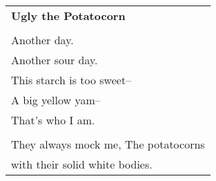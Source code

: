 \documentclass{article}
\begin{document}
\newcommand{\h}{\hspace{3ex}}
\newcommand{\hoar}{%
\begin{center}
\line(1,0){350}
\end{center}
}

\begin{center}
\begin{tabular}{l}
\textbf{Ugly the Potatocorn} \\
\\
Another day. \\
Another sour day. \\
This starch is too sweet--\\
A big yellow yam-- \\
That's who I am. \\
\\
They always mock me,
The potatocorns \\
with their solid white bodies. \\

\end{tabular}
\end{center}
\end{document}
